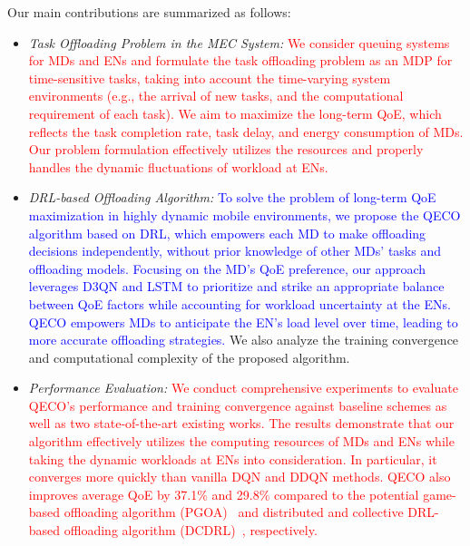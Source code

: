 \documentclass[10pt, journal,letterpaper]{IEEEtran}
\begin{document}
Our main contributions are summarized as follows:

\begin{itemize}
	\item \textit{Task Offloading Problem in the MEC System:} \textcolor{red}{ We consider queuing systems for MDs and ENs and formulate the task offloading problem as an MDP for time-sensitive tasks, taking into account the time-varying system environments (e.g., the arrival of new tasks, and the computational requirement of each task). We aim to maximize the long-term QoE, which reflects the task completion rate, task delay, and energy consumption of MDs. Our problem formulation effectively utilizes the resources and properly handles the dynamic fluctuations of workload at ENs. }
		
	
	 
	 
	 \item \textit{DRL-based Offloading Algorithm:} \textcolor{blue}{To solve the problem of long-term QoE maximization in highly dynamic mobile environments, we propose the QECO algorithm based on DRL, which empowers each MD to make offloading decisions independently, without prior knowledge of other MDs' tasks and offloading models. Focusing on the MD's QoE preference, our approach leverages D3QN and LSTM to prioritize and strike an appropriate balance between QoE factors while accounting for workload uncertainty at the ENs. QECO empowers MDs to anticipate the EN's load level over time, leading to more accurate offloading strategies.} We also analyze the training convergence and computational complexity of the proposed algorithm.

	\item \textit{Performance Evaluation:} \textcolor{red}{We conduct comprehensive experiments to evaluate QECO’s performance and training convergence against baseline schemes as well as two state-of-the-art existing works. The results demonstrate that our algorithm effectively utilizes the computing resources of MDs and ENs while taking the dynamic workloads at ENs into consideration. In particular, it converges more quickly than vanilla DQN and DDQN methods. QECO also improves average QoE by 37.1\% and 29.8\% compared to the potential game-based offloading algorithm (PGOA)~\cite{yang2018distributed} and distributed and collective DRL-based offloading algorithm (DCDRL)~\cite{qiu2020distributed}, respectively.}
	

\end{itemize}
\end{document}
